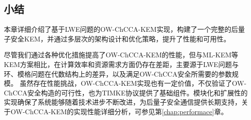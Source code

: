 \subsection{小结}

本章详细介绍了基于LWE问题的OW-ChCCA-KEM实现，构建了一个完整的后量子安全KEM，并通过多层次的架构设计和优化策略，提升了性能和可用性。

尽管我们通过各种优化措施提高了OW-ChCCA-KEM的性能，但与ML-KEM等KEM方案相比，在计算效率和资源需求方面仍存在差距，主要源于LWE问题与环、模格问题在代数结构上的差异，以及满足OW-ChCCA安全所需要的参数规模。
虽然存在性能挑战，OW-ChCCA-KEM实现也有一定价值，不仅验证了OW-ChCCA安全构造的可行性，也为TIMKE协议提供了基础组件。模块化和扩展性的实现确保了系统能够随着技术进步不断改进，为后量子安全通信提供长期支持，关于OW-ChCCA-KEM的实现性能详细分析，可参见第\ref{chap:performace}章。

